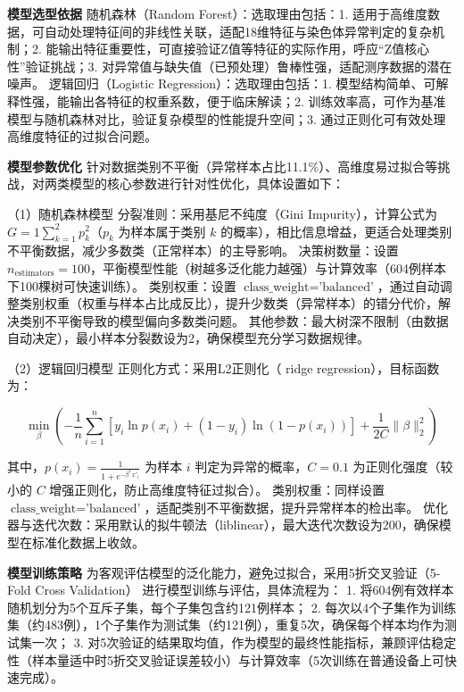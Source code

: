 \documentclass[withoutpreface,bwprint]{cumcmthesis} %
\begin{document}
\textbf{模型选型依据}
随机森林（Random Forest）：选取理由包括：1. 适用于高维度数据，可自动处理特征间的非线性关联，适配18维特征与染色体异常判定的复杂机制；2. 能输出特征重要性，可直接验证Z值等特征的实际作用，呼应“Z值核心性”验证挑战；3. 对异常值与缺失值（已预处理）鲁棒性强，适配测序数据的潜在噪声。  
逻辑回归（Logistic Regression）：选取理由包括：1. 模型结构简单、可解释性强，能输出各特征的权重系数，便于临床解读；2. 训练效率高，可作为基准模型与随机森林对比，验证复杂模型的性能提升空间；3. 通过正则化可有效处理高维度特征的过拟合问题。

\textbf{模型参数优化}
针对数据类别不平衡（异常样本占比11.1\%）、高维度易过拟合等挑战，对两类模型的核心参数进行针对性优化，具体设置如下：

（1）随机森林模型
分裂准则：采用基尼不纯度（Gini Impurity），计算公式为 $ G = 1 \sum_{k=1}^2 p_k^2 $（$ p_k $ 为样本属于类别 $ k $ 的概率），相比信息增益，更适合处理类别不平衡数据，减少多数类（正常样本）的主导影响。  
决策树数量：设置 $ n_{\text{estimators}} = 100 $，平衡模型性能（树越多泛化能力越强）与计算效率（604例样本下100棵树可快速训练）。  
类别权重：设置 $ \text{class\_weight} = \text{'balanced'} $，通过自动调整类别权重（权重与样本占比成反比），提升少数类（异常样本）的错分代价，解决类别不平衡导致的模型偏向多数类问题。  
其他参数：最大树深不限制（由数据自动决定），最小样本分裂数设为2，确保模型充分学习数据规律。

（2）逻辑回归模型
正则化方式：采用L2正则化（ ridge regression），目标函数为：  

  $$
  \min_{\beta} \left( -\frac{1}{n} \sum_{i=1}^n [y_i \ln p(x_i) + (1-y_i) \ln (1-p(x_i))] + \frac{1}{2C} \|\beta\|_2^2 \right)
  $$  

  其中，$ p(x_i) = \frac{1}{1+e^{-\beta^T x'_i}} $ 为样本 $ i $ 判定为异常的概率，$ C = 0.1 $ 为正则化强度（较小的 $ C $ 增强正则化，防止高维度特征过拟合）。  
类别权重：同样设置 $ \text{class\_weight} = \text{'balanced'} $，适配类别不平衡数据，提升异常样本的检出率。  
优化器与迭代次数：采用默认的拟牛顿法（liblinear），最大迭代次数设为200，确保模型在标准化数据上收敛。

\textbf{模型训练策略}
为客观评估模型的泛化能力，避免过拟合，采用5折交叉验证（5-Fold Cross Validation） 进行模型训练与评估，具体流程为：  
1. 将604例有效样本随机划分为5个互斥子集，每个子集包含约121例样本；  
2. 每次以4个子集作为训练集（约483例），1个子集作为测试集（约121例），重复5次，确保每个样本均作为测试集一次；  
3. 对5次验证的结果取均值，作为模型的最终性能指标，兼顾评估稳定性（样本量适中时5折交叉验证误差较小）与计算效率（5次训练在普通设备上可快速完成）。
\end{document}

